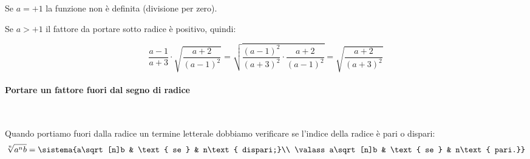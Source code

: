 \begin{esempi}{}{}
\begin{itemize}
Se \(a=+1\) la funzione non è definita (divisione per zero).

Se \(a>+1\) il fattore da portare sotto radice è positivo, quindi:

\vspace{-1em}
\[\dfrac{a-1}{a+3}\cdot \sqrt{\dfrac{a+2}{(a-1)^2}}=
\sqrt{\dfrac{(a-1)^2}{(a+3)^2}\cdot \dfrac{a+2}{(a-1)^2}}=
\sqrt{\dfrac{a+2}{(a+3)^2}}\]

\end{itemize}
\end{esempi}


\paragraph{Portare un fattore fuori dal segno di radice}~

Quando portiamo fuori dalla radice un termine letterale dobbiamo verificare 
se l'indice della radice è pari o dispari:
\[\sqrt[n]{a^nb} = 
\sistema{a\sqrt[n]b & \text{ se } & n\text{ dispari;}\\
         \valass a\sqrt[n]b & \text{ se } & n\text{ pari.}}\]


